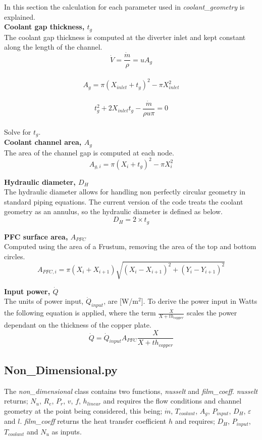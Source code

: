 \documentclass{article}
\begin{document}
In this section the calculation for each parameter used in \textit{coolant\_geometry} is explained. \\

\textbf{Coolant gap thickness, $t_{g}$} \\
The coolant gap thickness is computed at the diverter inlet and kept constant along the length of the channel. \\
\[\dot{V}=\frac{\dot{m}}{\rho}=uA_{g} \] \\
\[A_{g}= \pi(X_{inlet} + t_{g})^{2} - \pi X_{inlet}^{2} \] \\
\[t_{g}^{2} + 2X_{inlet}t_{g} - \frac{\dot{m}}{\rho u \pi} = 0\] \\
Solve for $t_{g}$. \\

\textbf{Coolant channel area, $A_{g}$} \\
The area of the channel gap is computed at each node.
\[A_{g,i}= \pi(X_{i} + t_{g})^{2} - \pi X_{i}^{2} \] 

\textbf{Hydraulic diameter, $D_{H}$} \\
The hydraulic diameter allows for handling non perfectly circular geometry in standard piping equations. The current version of the code treats the coolant geometry as an annulus, so the hydraulic diameter is defined as below. \\
\[D_{H}= 2\times t_{g} \] 

\textbf{PFC surface area, $A_{PFC}$} \\
Computed using the area of a Frustum, removing the area of the top and bottom circles. \\
\[A_{PFC,i}= \pi(X_{i} + X_{i+1}) \sqrt{(X_{i} - X_{i+1})^{2} + (Y_{i} - Y_{i+1})^{2}} \]

\textbf{Input power, $\dot{Q}$} \\
The units of power input, $\dot{Q}_{input}$, are [W/m$^{2}$]. To derive the power input in Watts the following equation is applied, where the term $\frac{X}{X + th_{copper}}$ scales the power dependant on the thickness of the copper plate.\\
\[\dot{Q} = \dot{Q}_{input} A_{PFC} \frac{X}{X+th_{copper}} \] 

\subsection{Non\_Dimensional.py}

The \textit{non\_dimensional} class contains two functions, \textit{nusselt} and \textit{film\_coeff}. \textit{nusselt} returns; $N_{u}$, $R_{e}$, $P_{r}$, $v$, $f$, $h_{linear}$ and requires the flow conditions and channel geometry at the point being considered, this being; $\dot{m}$, $T_{coolant}$, $A_{g}$, $P_{input}$, $D_{H}$, $\varepsilon$ and $l$. \textit{film\_coeff} returns the heat transfer coefficient $h$ and requires; $D_{H}$, $P_{input}$, $T_{coolant}$ and $N_{u}$ as inputs.
\end{document}

